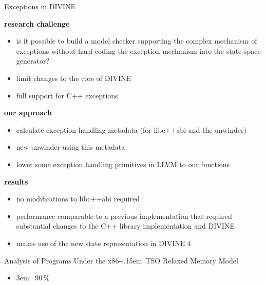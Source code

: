 \documentclass[aspectratio=169, fi]{paradise-slide}
\newcommand{\fcite}[1]{\emergencystretch 3em{\protect\NoHyper\cite{#1}}~\fullcite{#1}}
\newcommand{\xtso}{\mbox{x86-\kern-.15em TSO}\xspace}
\newenvironment{prespart}[1]{%
  \begin{frame}{}%
    \centering
      {\Large #1} \par\bigskip\bigskip%
}{%
  \end{frame}%
}
\begin{document}
\begin{frame}{Exceptions in DIVINE}

  \textbf{research challenge}
  \begin{itemize}
    \item is it possible to build a model checker supporting the complex mechanism of exceptions
      without hard-coding the exception mechanism into the state-space generator?
    \pause
    \item limit changes to the core of DIVINE
    \item full support for C++ exceptions
  \end{itemize}
  \pause

  \bigskip
  \textbf{our approach}
  \begin{itemize}
    \item calculate exception handling metadata (for libc++abi and the unwinder)
    \item new unwinder using this metadata
    \item lower some exception handling primitives in LLVM to our functions
  \end{itemize}
  \pause

  \bigskip
  \textbf{results}
  \begin{itemize}
    \item no modifications to libc++abi required
    \item performance comparable to a previous implementation that required substantial changes to
      the C++ library implementation and DIVINE
    \item makes use of the new state representation in DIVINE 4
  \end{itemize}
\end{frame}

\begin{prespart}{Analysis of Programs Under the \xtso Relaxed Memory Model}
  \begin{itemize}
    \item \fcite{SB2018x86tso} \hfill 90\,\%
  \end{itemize}
\end{prespart}
\end{document}
